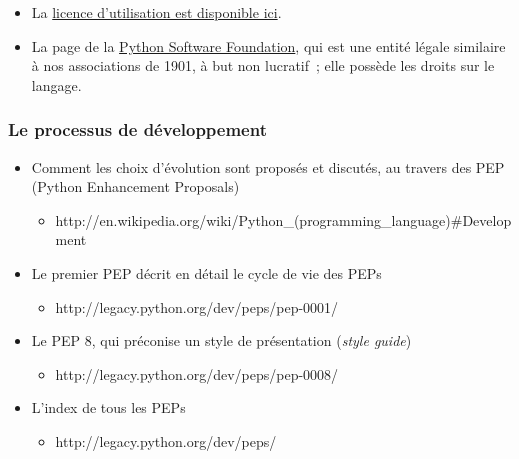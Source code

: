     \begin{itemize}
\tightlist
\item
  La \href{https://docs.python.org/3/license.html}{licence d'utilisation
  est disponible ici}.
\item
  La page de la \href{https://www.python.org/psf/}{Python Software
  Foundation}, qui est une entité légale similaire à nos associations de
  1901, à but non lucratif~; elle possède les droits sur le langage.
\end{itemize}

    \hypertarget{le-processus-de-duxe9veloppement}{%
\subsubsection{Le processus de
développement}\label{le-processus-de-duxe9veloppement}}

    \begin{itemize}
\tightlist
\item
  Comment les choix d'évolution sont proposés et discutés, au travers
  des PEP (Python Enhancement Proposals)

  \begin{itemize}
  \tightlist
  \item
    http://en.wikipedia.org/wiki/Python\_(programming\_language)\#Development
  \end{itemize}
\item
  Le premier PEP décrit en détail le cycle de vie des PEPs

  \begin{itemize}
  \tightlist
  \item
    http://legacy.python.org/dev/peps/pep-0001/
  \end{itemize}
\item
  Le PEP 8, qui préconise un style de présentation (\emph{style guide})

  \begin{itemize}
  \tightlist
  \item
    http://legacy.python.org/dev/peps/pep-0008/
  \end{itemize}
\item
  L'index de tous les PEPs

  \begin{itemize}
  \tightlist
  \item
    http://legacy.python.org/dev/peps/
  \end{itemize}
\end{itemize}


    
    
    
